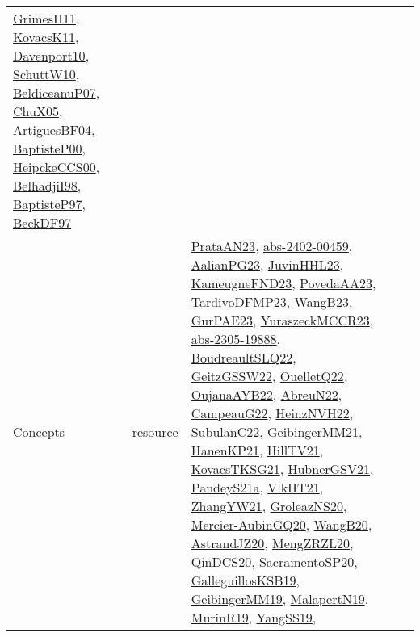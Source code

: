 {\begin{longtable}{llp{6cm}p{6cm}p{6cm}}
\href{papers/GrimesH11.pdf}{GrimesH11}\cite{GrimesH11}, \href{articles/KovacsK11.pdf}{KovacsK11}\cite{KovacsK11}, \href{papers/Davenport10.pdf}{Davenport10}\cite{Davenport10}, \href{papers/SchuttW10.pdf}{SchuttW10}\cite{SchuttW10}, \href{papers/BeldiceanuP07.pdf}{BeldiceanuP07}\cite{BeldiceanuP07}, \href{papers/ChuX05.pdf}{ChuX05}\cite{ChuX05}, \href{papers/ArtiguesBF04.pdf}{ArtiguesBF04}\cite{ArtiguesBF04}, \href{articles/BaptisteP00.pdf}{BaptisteP00}\cite{BaptisteP00}, \href{articles/HeipckeCCS00.pdf}{HeipckeCCS00}\cite{HeipckeCCS00}, \href{articles/BelhadjiI98.pdf}{BelhadjiI98}\cite{BelhadjiI98}, \href{papers/BaptisteP97.pdf}{BaptisteP97}\cite{BaptisteP97}, \href{papers/BeckDF97.pdf}{BeckDF97}\cite{BeckDF97}\\
Concepts & resource & \href{articles/PrataAN23.pdf}{PrataAN23}\cite{PrataAN23}, \href{articles/abs-2402-00459.pdf}{abs-2402-00459}\cite{abs-2402-00459}, \href{papers/AalianPG23.pdf}{AalianPG23}\cite{AalianPG23}, \href{papers/JuvinHHL23.pdf}{JuvinHHL23}\cite{JuvinHHL23}, \href{papers/KameugneFND23.pdf}{KameugneFND23}\cite{KameugneFND23}, \href{papers/PovedaAA23.pdf}{PovedaAA23}\cite{PovedaAA23}, \href{papers/TardivoDFMP23.pdf}{TardivoDFMP23}\cite{TardivoDFMP23}, \href{papers/WangB23.pdf}{WangB23}\cite{WangB23}, \href{articles/GurPAE23.pdf}{GurPAE23}\cite{GurPAE23}, \href{articles/YuraszeckMCCR23.pdf}{YuraszeckMCCR23}\cite{YuraszeckMCCR23}, \href{articles/abs-2305-19888.pdf}{abs-2305-19888}\cite{abs-2305-19888}, \href{papers/BoudreaultSLQ22.pdf}{BoudreaultSLQ22}\cite{BoudreaultSLQ22}, \href{papers/GeitzGSSW22.pdf}{GeitzGSSW22}\cite{GeitzGSSW22}, \href{papers/OuelletQ22.pdf}{OuelletQ22}\cite{OuelletQ22}, \href{papers/OujanaAYB22.pdf}{OujanaAYB22}\cite{OujanaAYB22}, \href{articles/AbreuN22.pdf}{AbreuN22}\cite{AbreuN22}, \href{articles/CampeauG22.pdf}{CampeauG22}\cite{CampeauG22}, \href{articles/HeinzNVH22.pdf}{HeinzNVH22}\cite{HeinzNVH22}, \href{articles/SubulanC22.pdf}{SubulanC22}\cite{SubulanC22}, \href{papers/GeibingerMM21.pdf}{GeibingerMM21}\cite{GeibingerMM21}, \href{papers/HanenKP21.pdf}{HanenKP21}\cite{HanenKP21}, \href{papers/HillTV21.pdf}{HillTV21}\cite{HillTV21}, \href{papers/KovacsTKSG21.pdf}{KovacsTKSG21}\cite{KovacsTKSG21}, \href{articles/HubnerGSV21.pdf}{HubnerGSV21}\cite{HubnerGSV21}, \href{articles/PandeyS21a.pdf}{PandeyS21a}\cite{PandeyS21a}, \href{articles/VlkHT21.pdf}{VlkHT21}\cite{VlkHT21}, \href{articles/ZhangYW21.pdf}{ZhangYW21}\cite{ZhangYW21}, \href{papers/GroleazNS20.pdf}{GroleazNS20}\cite{GroleazNS20}, \href{papers/Mercier-AubinGQ20.pdf}{Mercier-AubinGQ20}\cite{Mercier-AubinGQ20}, \href{papers/WangB20.pdf}{WangB20}\cite{WangB20}, \href{articles/AstrandJZ20.pdf}{AstrandJZ20}\cite{AstrandJZ20}, \href{articles/MengZRZL20.pdf}{MengZRZL20}\cite{MengZRZL20}, \href{articles/QinDCS20.pdf}{QinDCS20}\cite{QinDCS20}, \href{articles/SacramentoSP20.pdf}{SacramentoSP20}\cite{SacramentoSP20}, \href{papers/GalleguillosKSB19.pdf}{GalleguillosKSB19}\cite{GalleguillosKSB19}, \href{papers/GeibingerMM19.pdf}{GeibingerMM19}\cite{GeibingerMM19}, \href{papers/MalapertN19.pdf}{MalapertN19}\cite{MalapertN19}, \href{papers/MurinR19.pdf}{MurinR19}\cite{MurinR19}, \href{papers/YangSS19.pdf}{YangSS19}\cite{YangSS19}, 
\end{longtable}}

